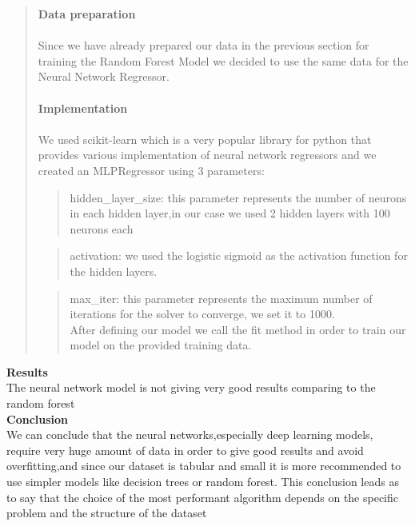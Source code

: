  \begin{quote}
\textbf{Data preparation}\\
\\
Since we have already prepared our data in the previous section for training the Random Forest Model we decided to use the same data for the Neural Network Regressor.\\
\\
\textbf{Implementation}\\
\\ 
We used scikit-learn which is a very popular library for python that provides various implementation of neural network regressors and we created an MLPRegressor using 3 parameters:\\
 \begin{quote}
hidden\_layer\_size: this parameter represents the number of neurons in each hidden layer,in our case we used 2 hidden layers with 100 neurons each\\
\end{quote}
 \begin{quote}
activation: we used the logistic sigmoid as the activation function for the hidden layers.\\
\end{quote}
 \begin{quote}
max\_iter: this parameter represents the maximum number of iterations for the solver to converge, we set it to 1000.\\
After defining our model we call the fit method in order to train our model on the provided training data.\\
\end{quote}
\end{quote}


\noindent \textbf{Results}\\

\noindent The neural network model is not giving very good results comparing to the random forest\\


\noindent \textbf{Conclusion}\\

\noindent We can conclude that the neural networks,especially deep learning models, require very huge amount of data in order to give good results and avoid overfitting,and since our dataset is tabular and small it is more recommended to use simpler models like decision trees or random forest. This conclusion leads as to say that the choice of the most performant algorithm depends on the specific problem and the structure of the dataset 


